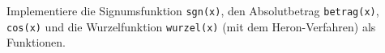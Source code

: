 \begin{aufg}
Implementiere die Signumsfunktion \verb|sgn(x)|, den Absolutbetrag \verb|betrag(x)|, \verb|cos(x)| und die Wurzelfunktion \verb|wurzel(x)| (mit dem Heron-Verfahren) als Funktionen.
\end{aufg}